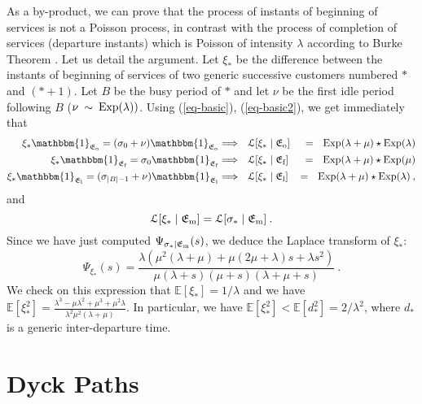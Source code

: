 \documentclass[11pt,a4paper]{article}
\numberwithin{equation}{section}
\newcommand{\mrm}[1]{\text{\rm #1}}
\newcommand{\fE}{\mathfrak{E}}
\newcommand{\1}{\mathbbm{1}}
\newcommand{\E}{\mathbb{E}}
\newcommand{\Lom}{\mathcal{L}}
\def\eref#1{(\ref{#1})}
\begin{document}
As a by-product, we can prove that the process of
instants of beginning of services is not a Poisson process,
in contrast
with the process of completion of services (departure instants) which
is Poisson of intensity $\lambda$ according to Burke Theorem
\cite{burk,reic}.
Let us detail the argument. Let $\xi_*$ be the difference between the
instants of beginning of services of two generic successive customers
numbered $*$ and $(*+1)$. Let $B$ be the busy period of $*$ and let $\nu$ be the first idle period following
$B$ ($\nu\: \sim \: \mrm{Exp}(\lambda))$. Using \eref{eq-basic},
\eref{eq-basic2}, we get immediately that
\begin{eqnarray*}
\xi_* \1_{\fE_{\mrm{o}}}=(\sigma_0+\nu) {\1}_{\fE_{\mrm{o}}} &
\Longrightarrow \ \
\Lom[\xi_*\mid \fE_{\mrm{o}}] & = \ \ \mrm{Exp}(\lambda+\mu) \star
\mrm{Exp}(\lambda)\\
\xi_* \1_{\fE_{\mrm{f}}}=\sigma_0 {\1}_{\fE_{\mrm{f}}} &
\Longrightarrow \ \
\Lom[\xi_*\mid \fE_{\mrm{f}}]& = \ \ \mrm{Exp}(\lambda+\mu) \star
\mrm{Exp}(\mu)\\
\xi_* {\1}_{\fE_{\mrm{l}}}=(\sigma_{|B|-1}+\nu) {\1}_{\fE_{\mrm{l}}} &
\Longrightarrow \ \
\Lom[\xi_*\mid \fE_{\mrm{l}}]& = \ \ \mrm{Exp}(\lambda+\mu) \star
\mrm{Exp}(\lambda)\:,
\end{eqnarray*}
and
\begin{equation*}
\Lom[\xi_* \mid \fE_{\mrm{m}}]  =  \Lom[\sigma_* \mid \fE_{\mrm{m}}]\:.
\end{equation*}
Since we have just computed $\Psi_{\sigma_* \mid \fE_{\mrm{m}}}(s)$, we
deduce the Laplace transform of $\xi_*$:
\begin{equation}\label{eq-interbeg}
\Psi_{\xi_*}(s) = \frac{\lambda (\mu^2(\lambda+\mu) +
  \mu(2\mu+\lambda)s+ \lambda
  s^2)}{\mu(\lambda+s)(\mu+s)(\lambda+\mu+s)}\:.
\end{equation}
We check on this expression that $\E[\xi_*]=1/\lambda$ and we have
$\E[\xi_*^2]
=\frac{\lambda^3-\mu\lambda^2+\mu^3+\mu^2\lambda}{\lambda^2\mu^2(\lambda
  +\mu)}$. In particular, we have $\E[\xi_*^2] < \E[d_*^2] =
2/\lambda^2$, where $d_*$ is a generic inter-departure time.


\section{Dyck Paths}
\label{se-dyck}
\end{document}

